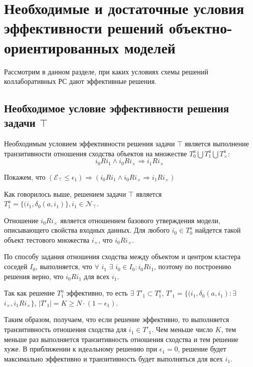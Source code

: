 \section{Необходимые и достаточные условия эффективности решений объектно-ориентированных моделей}
Рассмотрим в данном разделе, при каких условиях схемы решений коллаборативных РС дают 
эффективные решения.
\subsection{Необходимое условие эффективности решения задачи $\top$}
\begin{assert}
Необходимым условием эффективности решения задачи $\top$ является выполнение транзитивности отношения сходства 
объектов на множестве $T^a_0 \bigcup T^a_1 \bigcup T^a_{\times}$:
\begin{equation}
i_0 \mathit{R} i_{1} \wedge i_0 \mathit{R} i_{\times}  \Rightarrow i_{1} \mathit{R} i_{\times}
\end{equation}
\end{assert}
Покажем, что $(\mathcal{E}_{\top} \le \epsilon_1) \Rightarrow (i_0 \mathit{R} i_{1} \wedge i_0 \mathit{R} i_{\times}  
\Rightarrow i_{1} \mathit{R} i_{\times})$

\begin{myproof}
Как говорилось выше, решением задачи $\top$ является $T^a_{1} = \{(i_{1},\delta_0(a,i_{1})\}, i_{1} \in \mathcal{N}_{\top}$. 
\end{myproof}

Отношение $i_0 \mathit{R} i_{\times}$ является отношением базового утверждения модели\label{assertORS1}, описывающего свойства входных данных.
Для любого $i_0 \in T^a_0$ найдется такой объект тестового множества $i_{\times}$, что $i_0 \mathit{R} i_{\times}$.

По способу задания отношения сходства между объектом и центром кластера соседей $I_0$, выполняется, что 
$\forall$ $i_{1}$ $\exists$ $i_0 \in I_0: i_0 \mathit{R} i_{1}$, поэтому по построению решения верно, 
что $i_0 \mathit{R} i_{1}$ для всех $i_1$.

Так как решение $T^a_{1}$ эффективно, то есть $\exists$ $T'_1 \subset T^a_1$, $T'_1 = \{ (i_{1},\delta_0(a,i_{1}) : \exists$ $i_{\times}, i_{1} \mathit{R} i_{\times} \}$, $|T'_1| = K \ge N \cdot (1 - \epsilon_1)$. 

Таким образом, получаем, что если решение эффективно, то выполняется транзитивность отношения сходства для $i_1 \in T'_1$. 
Чем меньше число $K$, тем меньше раз выполняется транзитивность отношения сходства и тем решение хуже. 
В приближении к идеальному решению при $\epsilon_1 = 0$, решение будет максимально 
эффективно и транзитивность будет выполняться для всех $i_1$.

